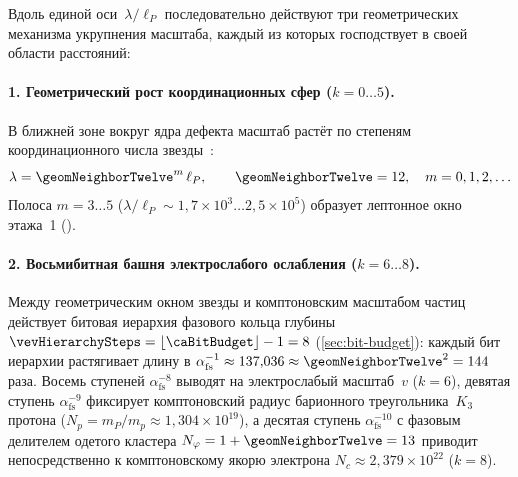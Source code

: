 Вдоль единой оси~$\lambda/\ell_P$ последовательно действуют три геометрических механизма укрупнения масштаба,
каждый из которых господствует в своей области расстояний:

\paragraph{1. Геометрический рост координационных сфер ($k=0\ldots 5$).}
В ближней зоне вокруг ядра дефекта масштаб растёт по степеням координационного числа звезды~\latGCKshort:
\[
  \lambda = \geomNeighborTwelve^{m}\,\ell_P,\qquad \geomNeighborTwelve = 12,\quad m = 0,1,2,\ldots
\]
Полоса $m=3\ldots 5$ ($\lambda/\ell_P \sim 1{,}7\times 10^3\ldots 2{,}5\times 10^5$) образует лептонное окно этажа~1 ().

\paragraph{2. Восьмибитная башня электрослабого ослабления ($k=6\ldots 8$).}
Между геометрическим окном звезды и комптоновским масштабом частиц действует битовая иерархия фазового кольца
глубины $\vevHierarchySteps = \lfloor\caBitBudget\rfloor - 1 = 8$ (\cref{sec:bit-budget}):
каждый бит иерархии растягивает длину в $\alpha_{\mathrm{fs}}^{-1}\approx 137{,}036\approx \geomNeighborTwelve^2=144$ раза.
Восемь ступеней $\alpha_{\mathrm{fs}}^{-8}$ выводят на электрослабый масштаб~$v$ ($k=6$),
девятая ступень $\alpha_{\mathrm{fs}}^{-9}$ фиксирует комптоновский радиус барионного треугольника~$K_3$ протона ($N_p = m_P/m_p \approx 1{,}304\times 10^{19}$),
а десятая ступень $\alpha_{\mathrm{fs}}^{-10}$ с фазовым делителем одетого кластера $N_\varphi = 1 + \geomNeighborTwelve = 13$
приводит непосредственно к комптоновскому якорю электрона $N_c \approx 2{,}379\times 10^{22}$ ($k=8$).

